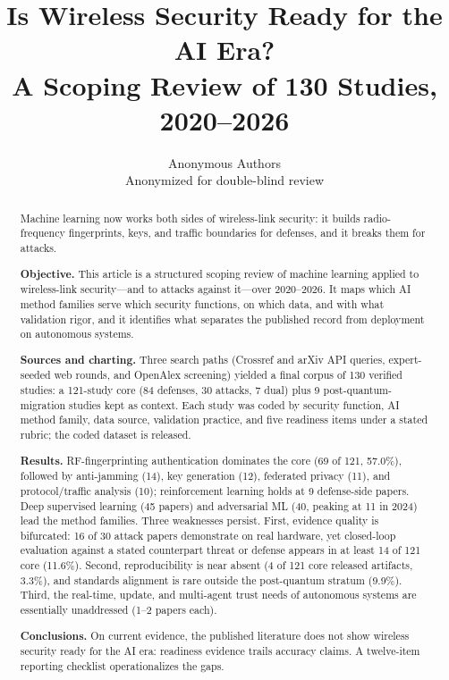 \documentclass[11pt,a4paper]{article}
\title{Is Wireless Security Ready for the AI Era?\\A Scoping Review of 130 Studies, 2020--2026}
\author{Anonymous Authors\\{\small Anonymized for double-blind review}}
\date{}
\begin{document}
\sloppy
\maketitle

\begin{abstract}
Machine learning now works both sides of wireless-link security: it builds radio-frequency fingerprints, keys, and traffic boundaries for defenses, and it breaks them for attacks.

\textbf{Objective.} This article is a structured scoping review of machine learning applied to wireless-link security---and to attacks against it---over 2020--2026. It maps which AI method families serve which security functions, on which data, and with what validation rigor, and it identifies what separates the published record from deployment on autonomous systems.

\textbf{Sources and charting.} Three search paths (Crossref and arXiv API queries, expert-seeded web rounds, and OpenAlex screening) yielded a final corpus of 130 verified studies: a 121-study core (84 defenses, 30 attacks, 7 dual) plus 9 post-quantum-migration studies kept as context. Each study was coded by security function, AI method family, data source, validation practice, and five readiness items under a stated rubric; the coded dataset is released.

\textbf{Results.} RF-fingerprinting authentication dominates the core (69 of 121, 57.0\%), followed by anti-jamming (14), key generation (12), federated privacy (11), and protocol/traffic analysis (10); reinforcement learning holds at 9 defense-side papers. Deep supervised learning (45 papers) and adversarial ML (40, peaking at 11 in 2024) lead the method families. Three weaknesses persist. First, evidence quality is bifurcated: 16 of 30 attack papers demonstrate on real hardware, yet closed-loop evaluation against a stated counterpart threat or defense appears in at least 14 of 121 core (11.6\%). Second, reproducibility is near absent (4 of 121 core released artifacts, 3.3\%), and standards alignment is rare outside the post-quantum stratum (9.9\%). Third, the real-time, update, and multi-agent trust needs of autonomous systems are essentially unaddressed (1--2 papers each).

\textbf{Conclusions.} On current evidence, the published literature does not show wireless security ready for the AI era: readiness evidence trails accuracy claims. A twelve-item reporting checklist operationalizes the gaps.
\end{abstract}
\end{document}
